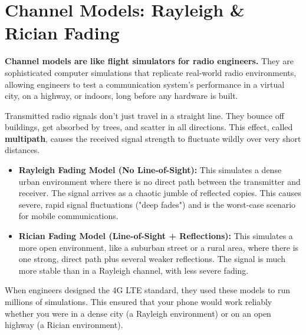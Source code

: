 
\chapter{Channel Models: Rayleigh \& Rician Fading}
\label{ch:fading}

\begin{nontechnical}
    \textbf{Channel models are like flight simulators for radio engineers.} They are sophisticated computer simulations that replicate real-world radio environments, allowing engineers to test a communication system's performance in a virtual city, on a highway, or indoors, long before any hardware is built.

     Transmitted radio signals don't just travel in a straight line. They bounce off buildings, get absorbed by trees, and scatter in all directions. This effect, called \textbf{multipath}, causes the received signal strength to fluctuate wildly over very short distances.

    \begin{itemize}
        \item \textbf{Rayleigh Fading Model (No Line-of-Sight):} This simulates a dense urban environment where there is no direct path between the transmitter and receiver. The signal arrives as a chaotic jumble of reflected copies. This causes severe, rapid signal fluctuations ("deep fades") and is the worst-case scenario for mobile communications.
        \item \textbf{Rician Fading Model (Line-of-Sight + Reflections):} This simulates a more open environment, like a suburban street or a rural area, where there is one strong, direct path plus several weaker reflections. The signal is much more stable than in a Rayleigh channel, with less severe fading.
    \end{itemize}

     When engineers designed the 4G LTE standard, they used these models to run millions of simulations. This ensured that your phone would work reliably whether you were in a dense city (a Rayleigh environment) or on an open highway (a Rician environment).
\end{nontechnical}


